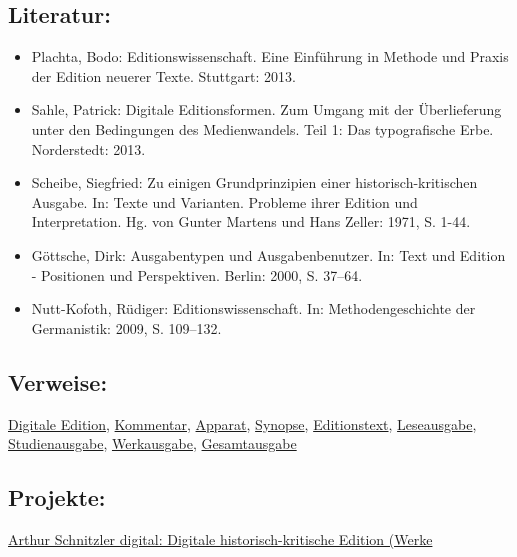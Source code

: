 \documentclass{article}
\begin{document}
        \subsection*{Literatur:}\begin{itemize}\item Plachta, Bodo: Editionswissenschaft. Eine Einführung in Methode und
                              Praxis der Edition neuerer Texte. Stuttgart: 2013.\item Sahle, Patrick: Digitale Editionsformen. Zum Umgang mit der
                              Überlieferung unter den Bedingungen des Medienwandels. Teil 1: Das
                              typografische Erbe. Norderstedt: 2013.\item Scheibe, Siegfried: Zu einigen Grundprinzipien einer historisch-kritischen
                              Ausgabe. In: Texte und Varianten. Probleme ihrer Edition und
                              Interpretation. Hg. von Gunter Martens und Hans Zeller: 1971, S. 1-44.\item Göttsche, Dirk: Ausgabentypen und Ausgabenbenutzer. In: Text und Edition - Positionen und Perspektiven. Berlin: 2000, S. 37–64.\item Nutt-Kofoth, Rüdiger: Editionswissenschaft. In: Methodengeschichte der Germanistik: 2009, S. 109–132.\end{itemize}\subsection*{Verweise:}\href{https://gams.uni-graz.at/o:konde.59}{Digitale Edition}, \href{https://gams.uni-graz.at/o:konde.34}{Kommentar}, \href{https://gams.uni-graz.at/o:konde.32}{Apparat}, \href{https://gams.uni-graz.at/o:konde.174}{Synopse}, \href{https://gams.uni-graz.at/o:konde.75}{Editionstext}, \href{https://gams.uni-graz.at/o:konde.116}{Leseausgabe}, \href{https://gams.uni-graz.at/o:konde.173}{Studienausgabe}, \href{https://gams.uni-graz.at/o:konde.213}{Werkausgabe}, \href{https://gams.uni-graz.at/o:konde.91}{Gesamtausgabe}\subsection*{Projekte:}\href{https://www.arthur-schnitzler.de}{Arthur
                           Schnitzler digital: Digitale historisch-kritische Edition (Werke
}
\end{document}

